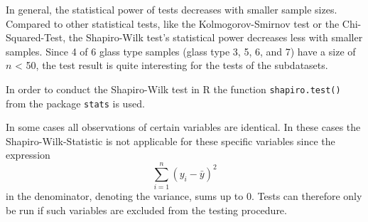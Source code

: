 \documentclass[a4paper, 12pt, titlepage, headsepline, listof = totoc, bibliography = totoc, numbers = noenddot]{scrartcl}
\begin{document}
In general, the statistical power of tests decreases with smaller sample sizes. Compared to other statistical tests, like the Kolmogorov-Smirnov test or the Chi-Squared-Test, the Shapiro-Wilk test's statistical power decreases less with smaller samples. Since 4 of 6 glass type samples (glass type 3, 5, 6, and 7) have a size of $n$ < 50, the test result is quite interesting for the tests of the subdatasets.

In order to conduct the Shapiro-Wilk test in R the function \texttt{shapiro.test()} from the package \texttt{stats} is used.

In some cases all observations of certain variables are identical. In these cases the Shapiro-Wilk-Statistic is not applicable for these specific variables since the expression 
\[ \sum \limits_{i=1}^n (y_i - \bar{y})^2 \]
in the denominator, denoting the variance, sums up to 0. Tests can therefore only be run if such variables are excluded from the testing procedure.
\end{document}
